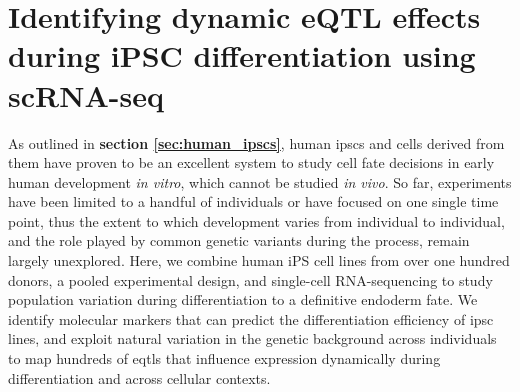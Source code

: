
\chapter{Identifying dynamic eQTL effects during iPSC differentiation using scRNA-seq}
\label{chapter4}

As outlined in \textbf{section 
\ref{sec:human_ipscs}},
human \glspl{ipsc} and cells derived from them have proven to be an excellent system to study cell fate decisions in early human development \textit{in vitro}, which cannot be studied \textit{in vivo}.
So far, experiments have been limited to a handful of individuals 
or have focused on one single time point,
thus the extent to which development varies from individual to individual, and the role played by common genetic variants during the process, remain largely unexplored.
Here, we combine human iPS cell lines from over one hundred donors, a pooled experimental design, and single-cell RNA-sequencing to study population variation during differentiation to a definitive endoderm fate. 
We identify molecular markers that can predict the differentiation efficiency of \gls{ipsc} lines, and exploit natural variation in the genetic background across individuals to map hundreds of \glspl{eqtl} that influence expression dynamically during differentiation and across cellular contexts.\\

\newpage

